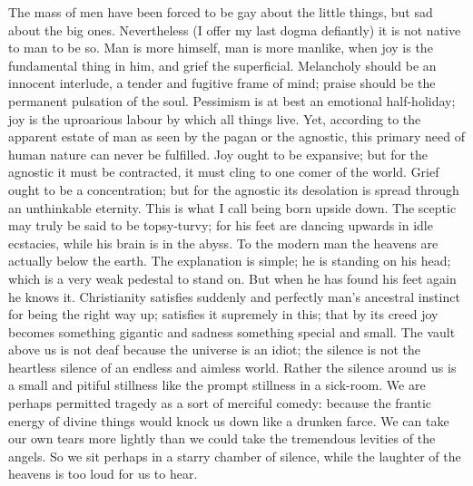The mass of men have been forced to be gay about the little things, but sad about the big ones. Nevertheless (I offer my last dogma defiantly) it is not native to man to be so. Man is more himself, man is more manlike, when joy is the fundamental thing in him, and grief the superficial. Melancholy should be an innocent interlude, a tender and fugitive frame of mind; praise should be the permanent pulsation of the soul. Pessimism is at best an emotional half-holiday; joy is the uproarious labour by which all things live. Yet, according to the apparent estate of man as seen by the pagan or the agnostic, this primary need of human nature can never be fulfilled. Joy ought to be expansive; but for the agnostic it must be contracted, it must cling to one comer of the world. Grief ought to be a concentration; but for the agnostic its desolation is spread through an unthinkable eternity. This is what I call being born upside down. The sceptic may truly be said to be topsy-turvy; for his feet are dancing upwards in idle ecstacies, while his brain is in the abyss. To the modern man the heavens are actually below the earth. The explanation is simple; he is standing on his head; which is a very weak pedestal to stand on. But when he has found his feet again he knows it. Christianity satisfies suddenly and perfectly man’s ancestral instinct for being the right way up; satisfies it supremely in this; that by its creed joy becomes something gigantic and sadness something special and small. The vault above us is not deaf because the universe is an idiot; the silence is not the heartless silence of an endless and aimless world. Rather the silence around us is a small and pitiful stillness like the prompt stillness in a sick-room. We are perhaps permitted tragedy as a sort of merciful comedy: because the frantic energy of divine things would knock us down like a drunken farce. We can take our own tears more lightly than we could take the tremendous levities of the angels. So we sit perhaps in a starry chamber of silence, while the laughter of the heavens is too loud for us to hear.

